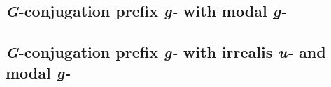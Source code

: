 \subsection{\textit{G}-conjugation prefix \textit{g-} with modal \textit{g̱-}}\label{sec:gconj-modal}

\subsection{\textit{G}-conjugation prefix \textit{g-} with irrealis \textit{u-} and modal \textit{g̱-}}\label{sec:gconj-irrealis+modal}
